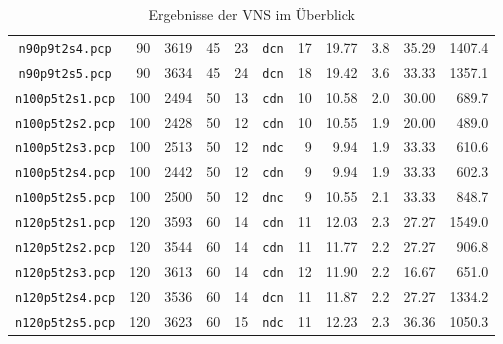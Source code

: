 \begin{table}[!htbp]
\begin{tabular}{c|rrr|r|c|rrr|r|r}
\texttt{n90p9t2s4.pcp} & 90	& 3619	& 45	& 23 & \texttt{dcn} & 17 & 19.77 & 3.8 & 35.29 & 1407.4\\
\texttt{n90p9t2s5.pcp} & 90	& 3634	& 45	& 24 & \texttt{dcn} & 18 & 19.42 & 3.6 & 33.33 & 1357.1\\
\texttt{n100p5t2s1.pcp} & 100	& 2494	& 50	& 13 & \texttt{cdn} & 10 & 10.58 & 2.0 & 30.00 & 689.7\\
\texttt{n100p5t2s2.pcp} & 100	& 2428	& 50	& 12 & \texttt{cdn} & 10 & 10.55 & 1.9 & 20.00 & 489.0\\
\texttt{n100p5t2s3.pcp} & 100	& 2513	& 50	& 12 & \texttt{ndc} & 9 & 9.94 & 1.9 & 33.33 & 610.6\\
\texttt{n100p5t2s4.pcp} & 100	& 2442	& 50	& 12 & \texttt{cdn} & 9 & 9.94 & 1.9 & 33.33 & 602.3\\
\texttt{n100p5t2s5.pcp} & 100	& 2500	& 50	& 12 & \texttt{dnc} & 9 & 10.55 & 2.1 & 33.33 & 848.7\\
\texttt{n120p5t2s1.pcp} & 120	& 3593	& 60	& 14 & \texttt{cdn} & 11 & 12.03 & 2.3 & 27.27 & 1549.0\\
\texttt{n120p5t2s2.pcp} & 120	& 3544	& 60	& 14 & \texttt{cdn} & 11 & 11.77 & 2.2 & 27.27 & 906.8\\
\texttt{n120p5t2s3.pcp} & 120	& 3613	& 60	& 14 & \texttt{cdn} & 12 & 11.90 & 2.2 & 16.67 & 651.0\\
\texttt{n120p5t2s4.pcp} & 120	& 3536	& 60	& 14 & \texttt{dcn} & 11 & 11.87 & 2.2 & 27.27 & 1334.2\\
\texttt{n120p5t2s5.pcp} & 120	& 3623	& 60	& 15 & \texttt{ndc} & 11 & 12.23 & 2.3 & 36.36 & 1050.3\\
\end{tabular}
\caption{Ergebnisse der VNS im Überblick}
\label{tab:result}
\end{table}
